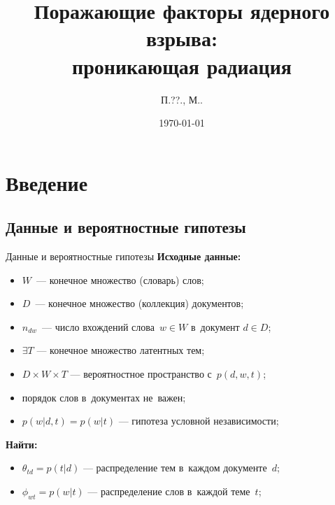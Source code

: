 \documentclass[unicode,lefteqn,c,hyperref={pdfpagelabels=false}]{beamer}
\title[\hbox to 56mm{Проникающая радиация\hfill\insertframenumber\,/\,\inserttotalframenumber}]{Поражающие факторы ядерного взрыва: \\проникающая радиация}
\author[П.\shortspace ??.\shortspaceАндрианов, М.\shortspaceО.\shortspaceБурмистров]{П.\shortspace ??.\shortspaceАндрианов, М.\shortspaceО.\shortspaceБурмистров}
\institute{\vfill Московский физико-технический институт
		\vfill Военная кафедра}
\date{\today}
\begin{document}
\begin{frame}
    \titlepage
\end{frame}
\section{Введение}
\subsection{Данные и вероятностные гипотезы}
\begin{frame}{Данные и вероятностные гипотезы}
    \textbf{Исходные данные:}
    \begin{itemize}
    		\item $W$~--- конечное множество (словарь) слов;
    		\item $D$~--- конечное множество (коллекция) документов;
    		\item $n_{dw}$~--- число вхождений слова~$w\in W$ в~документ $d\in D$;
    \end{itemize}

    \smallskip
    \begin{itemize}
    		\item $\exists T$ --- конечное множество латентных тем;
    		\item $D\times W\times T$ --- вероятностное пространство с~$p(d,w,t)$;
    		\item порядок слов в~документах не~важен;
    		\item $p(w|d,t) = p(w|t)$ --- гипотеза условной независимости;
    \end{itemize}

    \smallskip
    \textbf{Найти:}
    \begin{itemize}
    		\item $\theta_{td} = p(t|d)$ --- распределение тем в~каждом документе~$d$;
    		\item $\phi_{wt} = p(w|t)$ --- распределение слов в~каждой теме~$t$;
    \end{itemize}
\end{frame}
\end{document}
